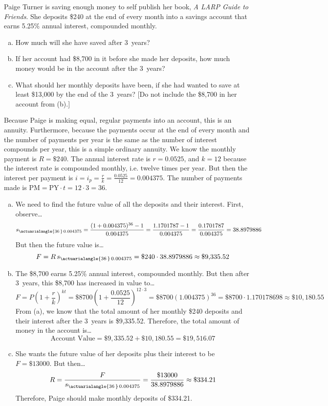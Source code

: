 \documentclass[11pt,letterpaper]{article}
\begin{document}
\newpage



 Paige Turner is saving enough money to self publish her book, \textit{A LARP Guide to Friends}. She deposits \$240 at the end of every month into a savings account that earns 5.25\% annual interest, compounded monthly. 
	\begin{enumerate}[(a)]
	\item How much will she have saved after 3~years?
	\item If her account had \$8,700 in it before she made her deposits, how much money would be in the account after the 3~years?
	\item What should her monthly deposits have been, if she had wanted to save at least \$13,000 by the end of the 3~years? [Do not include the \$8,700 in her account from (b).]
	\end{enumerate} \pspace

\sol Because Paige is making equal, regular payments into an account, this is an annuity. Furthermore, because the payments occur at the end of every month and the number of payments per year is the same as the number of interest compounds per year, this is a simple ordinary annuity. We know the monthly payment is $R= \$240$. The annual interest rate is $r= 0.0525$, and $k= 12$ because the interest rate is compounded monthly, i.e. twelve times per year. But then the interest per payment is $i= i_p= \frac{r}{k}= \frac{0.0525}{12}= 0.004375$. The number of payments made is $\text{PM}= \text{PY} \cdot t= 12 \cdot 3= 36$. 

\begin{enumerate}[(a)]
\item We need to find the future value of all the deposits and their interest. First, observe\dots
	\[
	s_{\actuarialangle{36 \,}\, 0.004375}= \dfrac{(1 + 0.004375)^{36} - 1}{0.004375}= \dfrac{1.1701787 - 1}{0.004375}= \dfrac{0.1701787}{0.004375}= 38.8979886
	\]
But then the future value is\dots
	\[
	F= R\, s_{\actuarialangle{36 \,}\, 0.004375}= \$240 \cdot 38.8979886 \approx \$9,\!335.52
	\] \pspace

\item The \$8,700 earns 5.25\% annual interest, compounded monthly. But then after 3~years, this \$8,700 has increased in value to\dots
	\[
	F= P \left(1 + \dfrac{r}{k} \right)^{kt}= \$8700 \left(1 + \dfrac{0.0525}{12} \right)^{12 \cdot 3}= \$8700 (1.004375)^{36}= \$8700 \cdot 1.170178698 \approx \$10,\!180.55
	\]
From (a), we know that the total amount of her monthly \$240 deposits and their interest after the 3~years is \$9,335.52. Therefore, the total amount of money in the account is\dots
	\[
	\text{Account Value}= \$9,\!335.52 + \$10,\!180.55= \$19,\!516.07
	\] \pspace

\item She wants the future value of her deposits plus their interest to be $F= \$13000$. But then\dots
	\[
	R= \dfrac{F}{s_{\actuarialangle{36 \,}\, 0.004375}}= \dfrac{\$13000}{38.8979886} \approx \$334.21
	\]
Therefore, Paige should make monthly deposits of \$334.21. 
\end{enumerate}
\end{document}
